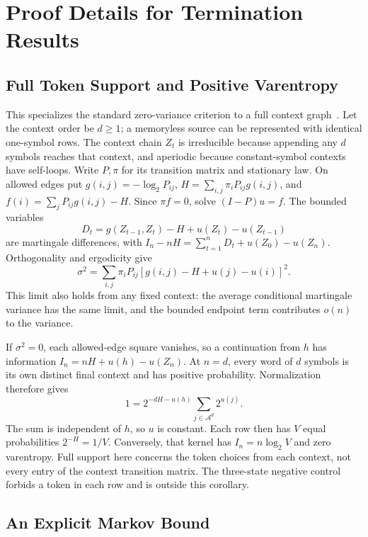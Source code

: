 \section{Proof Details for Termination Results}
\label{app:proofs}

\subsection{Full Token Support and Positive Varentropy}
\label{app:full-support}

This specializes the standard zero-variance criterion to a full context
graph~\cite{kontoyiannis1998recurrence}. Let the context order be $d\ge1$;
a memoryless source can be represented with identical one-symbol rows.
The context chain $Z_t$ is irreducible because appending any $d$ symbols
reaches that context, and aperiodic because constant-symbol contexts have
self-loops. Write $P,\pi$ for its transition matrix and stationary law.
On allowed edges put $g(i,j)=-\log_2P_{ij}$,
$H=\sum_{i,j}\pi_iP_{ij}g(i,j)$, and
$f(i)=\sum_jP_{ij}g(i,j)-H$. Since $\pi f=0$, solve
$(I-P)u=f$. The bounded variables
\[
 D_t=g(Z_{t-1},Z_t)-H+u(Z_t)-u(Z_{t-1})
\]
are martingale differences, with
$I_n-nH=\sum_{t=1}^nD_t+u(Z_0)-u(Z_n)$. Orthogonality and ergodicity give
\[
 \sigma^2=\sum_{i,j}\pi_iP_{ij}
       [g(i,j)-H+u(j)-u(i)]^2.
\]
This limit also holds from any fixed context: the average conditional
martingale variance has the same limit, and the bounded endpoint term
contributes $o(n)$ to the variance.

If $\sigma^2=0$, each allowed-edge square vanishes, so a continuation from
$h$ has information $I_n=nH+u(h)-u(Z_n)$. At $n=d$, every word of $d$ symbols
is its own distinct final context and has positive probability. Normalization
therefore gives
\[
 1=2^{-dH-u(h)}\sum_{j\in\mathcal A^d}2^{u(j)}.
\]
The sum is independent of $h$, so $u$ is constant. Each row then has $V$
equal probabilities $2^{-H}=1/V$. Conversely, that kernel has
$I_n=n\log_2V$ and zero varentropy. Full support here concerns the token
choices from each context, not every entry of the context transition matrix.
The three-state negative control forbids a token in each row and is outside
this corollary.

\subsection{An Explicit Markov Bound}
\label{app:markov-proof}

